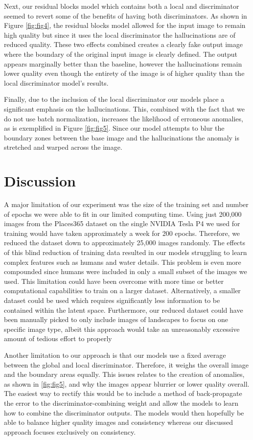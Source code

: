 \documentclass{article}
\begin{document}
Next, our residual blocks model which contains both a local and discriminator seemed to revert some of the benefits of having both discriminators. As shown in Figure \ref{fig:fig4}, the residual blocks model allowed for the input image to remain high quality but since it uses the local discriminator the hallucinations are of reduced quality. These two effects combined creates a clearly fake output image where the boundary of the original input image is clearly defined. The output appears marginally better than the baseline, however the hallucinations remain lower quality even though the entirety of the image is of higher quality than the local discriminator model's results.

Finally, due to the inclusion of the local discriminator our models place a significant emphasis on the hallucinations. This, combined with the fact that we do not use batch normalization, increases the likelihood of erroneous anomalies, as is exemplified in Figure \ref{fig:fig5}. Since our model attempts to blur the boundary zones between the base image and the hallucinations the anomaly is stretched and warped across the image.

\section{Discussion}
A major limitation of our experiment was the size of the training set and number of epochs we were able to fit in our limited computing time. Using just 200,000 images from the  Places365 dataset on the single NVIDIA Tesla P4 we used for training would have taken approximately a week for 200 epochs. Therefore, we reduced the dataset down to approximately 25,000 images randomly. The effects of this blind reduction of training data resulted in our models struggling to learn complex features such as humans and water details. This problem is even more compounded since humans were included in only a small subset of the images we used. This limitation could have been overcome with more time or better computational capabilities to train on a larger dataset. Alternatively, a smaller dataset could be used which requires significantly less information to be contained within the latent space. Furthermore, our reduced dataset could have been manually picked to only include images of landscapes to focus on one specific image type, albeit this approach would take an unreasonably excessive amount of tedious effort to properly 

Another limitation to our approach is that our models use a fixed average between the global and local discriminator. Therefore, it weighs the overall image and the boundary areas equally. This issues relates to the creation of anomalies, as shown in \ref{fig:fig5}, and why the images appear blurrier or lower quality overall. The easiest way to rectify this would be to include a method of back-propagate the error to the discriminator-combining weight and allow the models to learn how to combine the discriminator outputs. The models would then hopefully be able to balance higher quality images and consistency whereas our discussed approach focuses exclusively on consistency.
\end{document}
